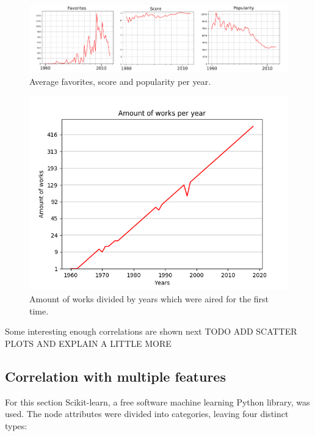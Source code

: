\begin{figure}[!hbt]
	\begin{center}
	\includegraphics[width=\columnwidth]{graphics/avgFavoritesScorePopularityPerYear.png}
	\caption{Average favorites, score and popularity per year.}
	\label{fig:avgCaracteristicsOfWorks}
	\end{center}
\end{figure}

\begin{figure}[!hbt]
	\begin{center}
	\includegraphics[width=\columnwidth]{graphics/worksPerYear_1960-2018.png}
	\caption{Amount of works divided by years which were aired for the first time.}
	\label{fig:amountOfWorksPerYear}
	\end{center}
\end{figure}

Some interesting enough correlations are shown next
TODO ADD SCATTER PLOTS AND EXPLAIN A LITTLE MORE

\subsection{Correlation with multiple features}
For this section Scikit-learn, a free software machine learning Python library, was used. The node attributes were divided into categories, leaving four distinct types:

